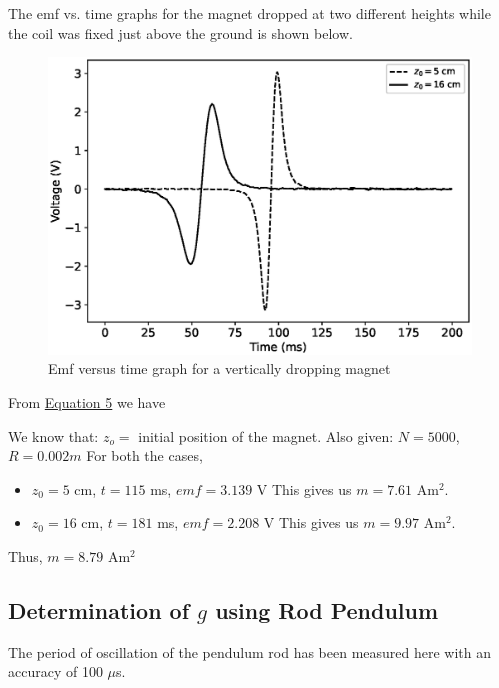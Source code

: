 The emf vs. time graphs for the magnet dropped at two different heights while the coil was fixed just above the ground is shown below.
\begin{figure}[H]
    \centering
    \includegraphics[width=1\columnwidth]{images/em.eps}
    \caption{Emf versus time graph for a vertically dropping magnet}
\end{figure}

From \hyperref[eq:4]{Equation 5} we have

We know that: $z_o=$ initial position of the magnet.
Also given:
$N=5000$,
$R = 0.002 m$
For both the cases,
\begin{itemize}
    \item $z_0 = 5$ cm, $t = 115$ ms, $emf = 3.139$ V
    This gives us $m = 7.61$ Am$^2$.
    \item $z_0 = 16$ cm, $t = 181$ ms, $emf = 2.208$ V
    This gives us $m = 9.97$ Am$^2$.
\end{itemize}

Thus, $m=8.79$ Am$^2$

\subsection{Determination of $g$ using Rod Pendulum}

The period of oscillation of the pendulum rod has been measured here with an accuracy of 100 $\mu$s. 

